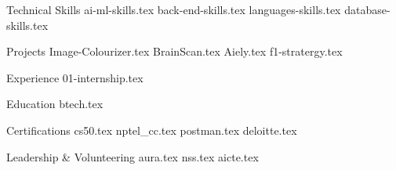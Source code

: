 \documentclass{cv_template}
\begin{document}
\begin{fitpage}

\makecvheader


\begin{cvsection}{Technical Skills}
    {ai-ml-skills.tex}
    {back-end-skills.tex}
    {languages-skills.tex}
    {database-skills.tex}
\end{cvsection}

\begin{cvsection}{Projects}
    {Image-Colourizer.tex}
    {BrainScan.tex}
    {Aiely.tex}
    {f1-stratergy.tex}
\end{cvsection}

\begin{cvsection}{Experience}
    {01-internship.tex}
\end{cvsection}

\begin{cvsection}{Education}
    {btech.tex}
\end{cvsection}

\begin{cvsection}{Certifications}
    {cs50.tex}
    {nptel_cc.tex}
    {postman.tex}
    {deloitte.tex}
\end{cvsection}

\begin{cvsection}{Leadership \& Volunteering}
    {aura.tex}
    {nss.tex}
    {aicte.tex}
\end{cvsection}

\end{fitpage}
\end{document}
